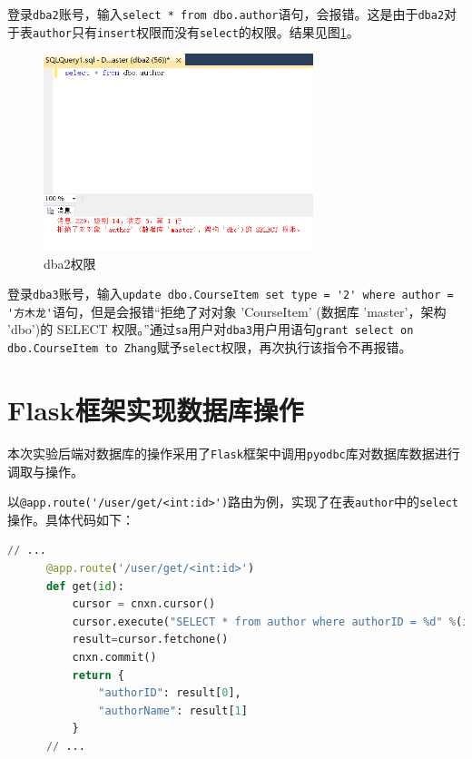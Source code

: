 \documentclass[11pt]{article}
\begin{document}
  登录\verb|dba2|账号，输入\lstinline{select * from dbo.author}语句，会报错。这是由于\verb|dba2|对于表\verb|author|只有\verb|insert|权限而没有\verb|select|的权限。结果见图\ref{fig:dba2}。
  \begin{figure}[h]
    \centering
    \includegraphics[width=0.7\textwidth]{dba2.png}
    \caption{dba2权限}
    \label{fig:dba2}
  \end{figure}

  登录\verb|dba3|账号，输入\lstinline{update dbo.CourseItem set type = '2' where author = '方木龙'}语句，但是会报错“拒绝了对对象 'CourseItem' (数据库 'master'，架构 'dbo')的 SELECT 权限。”通过\verb|sa|用户对\verb|dba3|用户用语句\lstinline{grant select on dbo.CourseItem to Zhang}赋予\verb|select|权限，再次执行该指令不再报错。
  
  \section{Flask框架实现数据库操作}

  本次实验后端对数据库的操作采用了\verb|Flask|框架中调用\verb|pyodbc|库对数据库数据进行调取与操作。

  以\lstinline|@app.route('/user/get/<int:id>')|路由为例，实现了在表\verb|author|中的\verb|select|操作。具体代码如下：

  \begin{file}[app.py]
    \begin{lstlisting}[language=Python]
      // ...
      @app.route('/user/get/<int:id>')
      def get(id):
          cursor = cnxn.cursor()
          cursor.execute("SELECT * from author where authorID = %d" %(id))
          result=cursor.fetchone() 
          cnxn.commit() 
          return {
              "authorID": result[0],
              "authorName": result[1]
          }
      // ...
    \end{lstlisting}
  \end{file}
\end{document}
